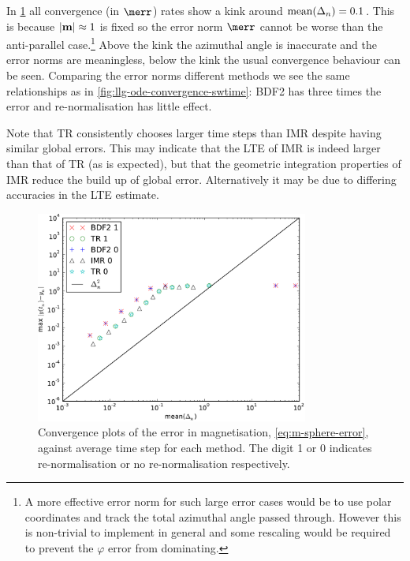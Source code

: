 In \cref{fig:llg-ode-convergence-m} all convergence (in $\merr$) rates show a kink around $\operatorname{mean}(\Delta_{n}) = 0.1$.
This is because $\left|{\boldsymbol{\mathrm{m}}} \right| \approx 1$ is fixed so the error norm $\merr$ cannot be worse than the anti-parallel case.\footnote{A more effective error norm for such large error cases would be to use polar coordinates and track the total azimuthal angle passed through. However this is non-trivial to implement in general and some rescaling would be required to prevent the $\varphi$ error from dominating.}
Above the kink the azimuthal angle is inaccurate and the error norms are meaningless, below the kink the usual convergence behaviour can be seen.
Comparing the error norms different methods we see the same relationships as in \cref{fig:llg-ode-convergence-swtime}: BDF2 has three times the error and re-normalisation has little effect.


Note that TR consistently chooses larger time steps than IMR despite having similar global errors.
This may indicate that the LTE of IMR is indeed larger than that of TR (as is expected), but that the geometric integration properties of IMR reduce the build up of global error.
Alternatively it may be due to differing accuracies in the LTE estimate.



\begin{figure}
  \centering
  \includegraphics[width=0.8\textwidth]{plots/ode_llg_adaptive_convergence/maxoferrornormsvsmeanofdts}
  \caption{Convergence plots of the error in magnetisation, \cref{eq:m-sphere-error}, against average time step for each method. The digit 1 or 0 indicates re-normalisation or no re-normalisation respectively.}
  \label{fig:llg-ode-convergence-m}
\end{figure}

